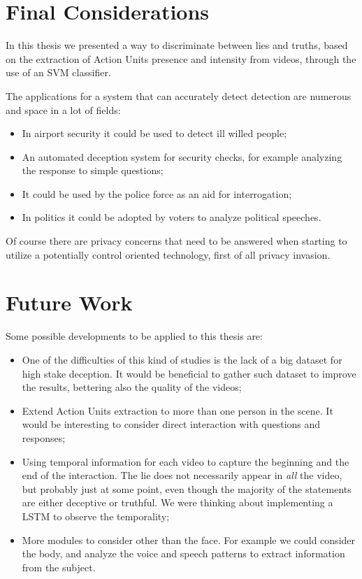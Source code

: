 
\section{Final Considerations}
In this thesis we presented a way to discriminate between lies and truths, based on the extraction of Action Units presence and intensity from videos, through the use of an SVM classifier.

The applications for a system that can accurately detect detection are numerous and space in a lot of fields:
\begin{itemize}
	\item In airport security it could be used to detect ill willed people;
	\item An automated deception system for security checks, for example analyzing the response to simple questions;
	\item It could be used by the police force as an aid for interrogation;
	\item In politics it could be adopted by voters to analyze political speeches.
\end{itemize}
Of course there are privacy concerns that need to be answered when starting to utilize a potentially control oriented technology, first of all privacy invasion.

\section{Future Work} \label{fw}
Some possible developments to be applied to this thesis are:
\begin{itemize}
	\item One of the difficulties of this kind of studies is the lack of a big dataset for high stake deception. It would be beneficial to gather such dataset to improve the results, bettering also the quality of the videos;
	\item Extend Action Units extraction to more than one person in the scene. It would be interesting to consider direct interaction with questions and responses;
	\item Using temporal information for each video to capture the beginning and the end of the interaction. The lie does not necessarily appear in \textit{all} the video, but probably just at some point, even though the majority of the statements are either deceptive or truthful. We were thinking about implementing a LSTM to observe the temporality;
	\item More modules to consider other than the face. For example we could consider the body, and analyze the voice and speech patterns to extract information from the subject.
\end{itemize}